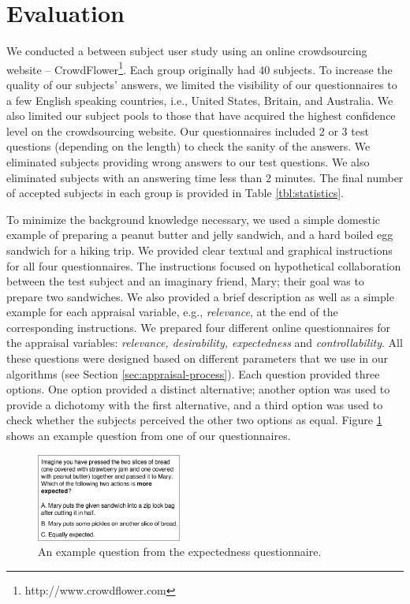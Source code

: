 \documentclass{aamas2016}
\begin{document}
\vspace*{-3mm}
\section{Evaluation}
\label{sec:user-study}

We conducted a between subject user study using an online crowdsourcing
website -- CrowdFlower\footnote{http://www.crowdflower.com}. Each group
originally had 40 subjects. To increase the quality of our subjects' answers, we
limited the visibility of our questionnaires to a few English speaking
countries, i.e., United States, Britain, and Australia. We also limited our
subject pools to those that have acquired the highest confidence level on the
crowdsourcing website. Our questionnaires included 2 or 3 test questions
(depending on the length) to check the sanity of the answers. We eliminated
subjects providing wrong answers to our test questions. We also eliminated
subjects with an answering time less than 2 minutes. The final number of
accepted subjects in each group is provided in Table \ref{tbl:statistics}.

To minimize the background knowledge necessary, we used a simple domestic
example of preparing a peanut butter and jelly sandwich, and a hard boiled egg
sandwich for a hiking trip. We provided clear textual and graphical instructions
for all four questionnaires. The instructions focused on hypothetical
collaboration between the test subject and an imaginary friend, Mary; their goal
was to prepare two sandwiches. We also provided a brief description as well as a
simple example for each appraisal variable, e.g., \textit{relevance}, at the end
of the corresponding instructions. We prepared four different online
questionnaires for the appraisal variables: \textit{relevance, desirability,
expectedness} and \textit{controllability}. All these questions were designed
based on different parameters that we use in our algorithms (see Section
\ref{sec:appraisal-process}). Each question provided three options. One option
provided a distinct alternative; another option was used to provide a dichotomy
with the first alternative, and a third option was used to check whether the
subjects perceived the other two options as equal. Figure \ref{fig:qs} shows an
example question from one of our questionnaires.

\vspace*{-2mm}
\begin{figure}[tbh]
  \centering
  \includegraphics[width=0.425\textwidth]{figure/question-sample-croped.pdf}
  \caption{{\fontsize{9}{9}\selectfont An example question from the expectedness
  questionnaire.}}
  \label{fig:qs}
\end{figure}
\end{document}
